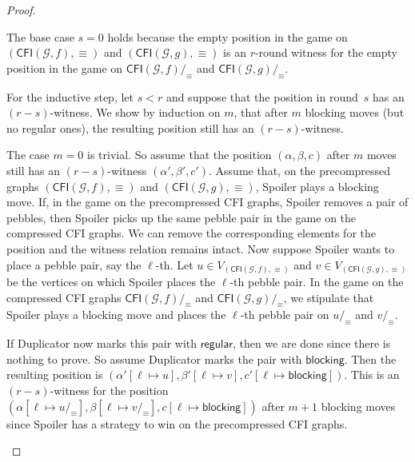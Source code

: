 \documentclass[10pt,a4paper]{article}
\newcommand{\regular}{\mathsf{regular}}
\newcommand{\blocking}{\mathsf{blocking}}
\newcommand{\comp}{\equiv}
\newcommand{\CFIsym}{\mathsf{CFI}}
\newcommand{\CFI}[1]{\CFIsym(#1)}
\newcommand{\compCFI}[2]{\CFI{#1}/_{#2}}
\newcommand{\precompCFI}[2]{{(\CFI{#1},#2)}}
\newcommand{\graphG}{\mathcal{G}}
\begin{document}
\begin{proof}
\begin{enumerate}
The base case $s=0$ holds because the empty position in the game on $\precompCFI{\graphG,f}{\comp}$ and $\precompCFI{\graphG,g}{\comp}$ is an $r$\nobreakdash-round witness for the empty position in the game on  $\compCFI{\graphG,f}{\comp}$ and $\compCFI{\graphG,g}{\comp}$.
        
        
        For the inductive step, let $s<r$ and suppose that the position in round~$s$ has an ${(r-s)}$\nobreakdash-witness.
        We show by induction on $m$,
        that after $m$ blocking moves (but no regular ones),
        the resulting position still has an $(r-s)$\nobreakdash-witness.

        The case $m=0$ is trivial.
        So assume that the position $(\alpha,\beta,c)$ after $m$ moves
        still has an $(r-s)$-witness $(\alpha',\beta',c')$.
        Assume that, on the precompressed graphs $\precompCFI{\graphG,f}{\comp}$ and $\precompCFI{\graphG,g}{\comp}$, 
        Spoiler plays a blocking move.
        If, in the game on the precompressed CFI graphs, Spoiler removes a pair of pebbles, then Spoiler picks up the same pebble pair
        in the game on the compressed CFI graphs.
        We can remove the corresponding elements for the position and the witness relation remains intact.
        Now suppose Spoiler wants to place a pebble pair,
        say the $\ell$-th.
        Let $u \in V_{\precompCFI{\graphG,f}{\comp}}$ and $v \in V_{\precompCFI{\graphG,g}{\comp}}$ be the vertices on which Spoiler places the $\ell$-th pebble pair.
        In the game on the compressed CFI graphs $\compCFI{\graphG,f}{\comp}$ and $\compCFI{\graphG,g}{\comp}$,
        we stipulate that Spoiler plays a blocking move and
        places the $\ell$-th pebble pair on $u/_\comp$ and $v/_\comp$.

        If Duplicator now marks this pair with $\regular$, then we are done since there is nothing to prove.
        So assume Duplicator marks the pair with $\blocking$. Then the resulting position is $(\alpha'[\ell \mapsto u],\beta'[\ell \mapsto v], c'[\ell\mapsto \blocking])$. This is an $(r-s)$-witness
        for the position $(\alpha[\ell \mapsto u/_\comp],\beta[\ell \mapsto v/_\comp], c[\ell\mapsto \blocking])$ after $m+1$ blocking moves
        since Spoiler has a strategy to win on the precompressed CFI graphs. 
        

\end{enumerate}
\end{proof}
\end{document}
